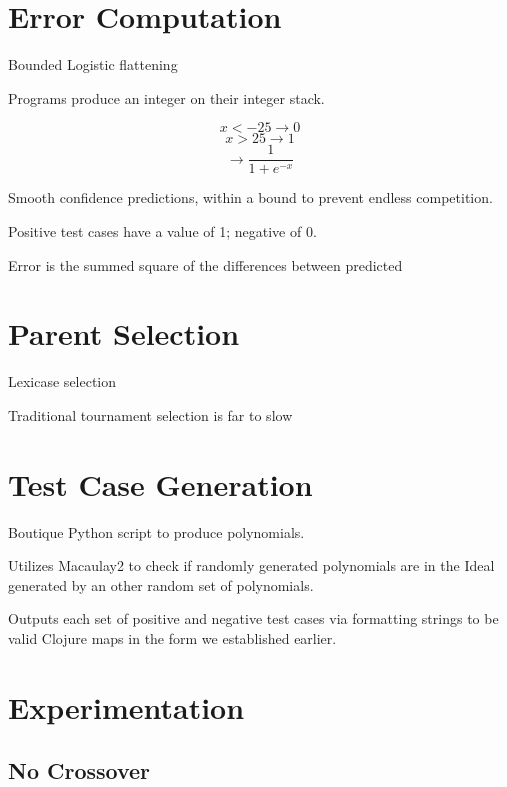 \documentclass[20pt]{extarticle}
\begin{document}
% 


\newpage
\section*{Error Computation}

\noindent Bounded Logistic flattening

\noindent Programs produce an integer on their integer stack. 

 $$x < -25 \rightarrow 0 $$
 $$x > 25  \rightarrow 1 $$
 $$\rightarrow \frac{1}{1+e^{-x}}$$

Smooth confidence predictions, within a bound to prevent endless competition. 

Positive test cases have a value of 1; negative of 0.

Error is the summed square of the differences between predicted 

\newpage
\section*{Parent Selection}

Lexicase selection

Traditional tournament selection is far to slow


\newpage
\section*{Test Case Generation}

Boutique Python script to produce polynomials. 

Utilizes Macaulay2 to check if randomly generated polynomials are in the Ideal generated by an other random set of polynomials.

Outputs each set of positive and negative test cases via formatting strings to be valid Clojure maps in the form we established earlier.

\newpage
\section*{Experimentation}
\subsection*{No Crossover}
\end{document}
